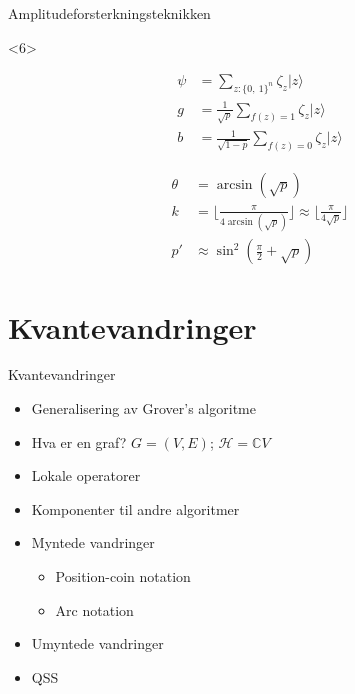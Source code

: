 \documentclass[norsk]{beamer}
\begin{document}
\begin{frame}{Amplitudeforsterkningsteknikken}
\begin{itemize}
			\begin{onlyenv}<6>
				\begin{minipage}{0.45\textwidth}
					\begin{align*}
						\psi & = \sum_{z:\{0,\ 1\}^n}\zeta_z|z\rangle \\
						g & = \frac{1}{\sqrt{p}}\sum_{f(z)=1}\zeta_z|z\rangle \\
						b & = \frac{1}{\sqrt{1-p}}\sum_{f(z)=0}\zeta_z|z\rangle
					\end{align*}
				\end{minipage}%
				\begin{minipage}{0.45\textwidth}
					\begin{align*}
						\theta & = \arcsin(\sqrt{p}) \\
						k & = \lfloor\frac{\pi}{4\arcsin(\sqrt{p})}\rfloor \approx \lfloor\frac{\pi}{4\sqrt{p}}\rfloor \\
						p' & \approx \sin^2(\frac{\pi}{2}+\sqrt{p})
					\end{align*}
				\end{minipage}
			\end{onlyenv}
		\end{itemize}
		
	\end{frame}

\section{Kvantevandringer}

	\begin{frame}{Kvantevandringer}
		\begin{itemize}
			\item Generalisering av Grover's algoritme
			\item Hva er en graf? $G=(V,E)$; $\mathcal{H} = \mathbb{C}V$
			\item Lokale operatorer
			\item Komponenter til andre algoritmer
			\item Myntede vandringer
			\begin{itemize}
				\item Position-coin notation
				\item Arc notation
			\end{itemize}
			\item Umyntede vandringer
			\item QSS
		\end{itemize}
	\end{frame}
\end{document}
